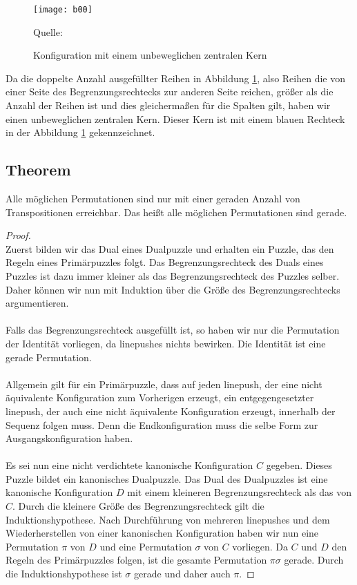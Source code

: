 \documentclass[seminar,german]{algothesis}
\newcommand*{\quelle}{%
  \footnotesize Quelle:
}
\begin{document}
\begin{figure}[ht]
	\centering
	\texttt{[image: b00]}
	\caption{Konfiguration mit einem unbeweglichen zentralen Kern}
	\quelle \cite{akitaya2022pushing}
	\label{fig:12}
\end{figure}

\noindent Da die doppelte Anzahl ausgefüllter Reihen in Abbildung \ref{fig:12}, also Reihen die von einer Seite des Begrenzungsrechtecks zur anderen Seite reichen, größer als die Anzahl der Reihen ist und dies gleichermaßen für die Spalten gilt, haben wir einen unbeweglichen zentralen Kern. Dieser Kern ist mit einem blauen Rechteck in der Abbildung \ref{fig:12} gekennzeichnet.
\subsection{Theorem}
Alle möglichen Permutationen sind nur mit einer geraden Anzahl von Transpositionen erreichbar. Das heißt alle möglichen Permutationen sind gerade.
\begin{proof}\noindent\\
Zuerst bilden wir das Dual eines Dualpuzzle und erhalten ein Puzzle, das den Regeln eines Primärpuzzles folgt. Das Begrenzungsrechteck des Duals eines Puzzles ist dazu immer kleiner als das Begrenzungsrechteck des Puzzles selber. Daher können wir nun mit Induktion über die Größe des Begrenzungsrechtecks argumentieren.\\\\
Falls das Begrenzungsrechteck ausgefüllt ist, so haben wir nur die Permutation der Identität vorliegen, da linepushes nichts bewirken. Die Identität ist eine gerade Permutation.\\\\
Allgemein gilt für ein Primärpuzzle, dass auf jeden linepush, der eine nicht äquivalente Konfiguration zum Vorherigen erzeugt, ein entgegengesetzter linepush, der auch eine nicht äquivalente Konfiguration erzeugt, innerhalb der Sequenz folgen muss. Denn die Endkonfiguration muss die selbe Form zur Ausgangskonfiguration haben.\\\\
Es sei nun eine nicht verdichtete kanonische Konfiguration $C$ gegeben. Dieses Puzzle bildet ein kanonisches Dualpuzzle. Das Dual des Dualpuzzles ist eine kanonische Konfiguration $D$ mit einem kleineren Begrenzungsrechteck als das von $C$. Durch die kleinere Größe des Begrenzungsrechteck gilt die Induktionshypothese. Nach Durchführung von mehreren linepushes und dem Wiederherstellen von einer kanonischen Konfiguration haben wir nun eine Permutation $\pi$ von $D$  und eine Permutation $\sigma$ von $C$ vorliegen. Da $C$ und $D$ den Regeln des Primärpuzzles folgen, ist die gesamte Permutation $\pi\sigma$ gerade. Durch die Induktionshypothese ist $\sigma$ gerade und daher auch $\pi$.
\end{proof}
\end{document}
